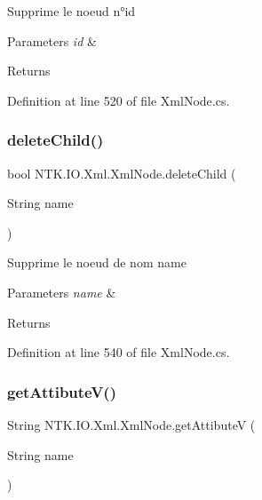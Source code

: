 Supprime le noeud n°id 


\begin{DoxyParams}{Parameters}
{\em id} & \\
\hline
\end{DoxyParams}
\begin{DoxyReturn}{Returns}

\end{DoxyReturn}


Definition at line 520 of file Xml\+Node.\+cs.

\mbox{\label{class_n_t_k_1_1_i_o_1_1_xml_1_1_xml_node_a03a39fffd178b928c0eef6623f4ef7ed}} 
\subsubsection{\texorpdfstring{deleteChild()}{deleteChild()}\hspace{0.1cm}{\footnotesize\ttfamily [2/2]}}
{\footnotesize\ttfamily bool N\+T\+K.\+I\+O.\+Xml.\+Xml\+Node.\+delete\+Child (\begin{DoxyParamCaption}\item[{String}]{name }\end{DoxyParamCaption})}



Supprime le noeud de nom name 


\begin{DoxyParams}{Parameters}
{\em name} & \\
\hline
\end{DoxyParams}
\begin{DoxyReturn}{Returns}

\end{DoxyReturn}


Definition at line 540 of file Xml\+Node.\+cs.

\mbox{\label{class_n_t_k_1_1_i_o_1_1_xml_1_1_xml_node_a1f6585774be829cad7e6416b8e9a177b}} 
\subsubsection{\texorpdfstring{getAttibuteV()}{getAttibuteV()}}
{\footnotesize\ttfamily String N\+T\+K.\+I\+O.\+Xml.\+Xml\+Node.\+get\+AttibuteV (\begin{DoxyParamCaption}\item[{String}]{name }\end{DoxyParamCaption})}







